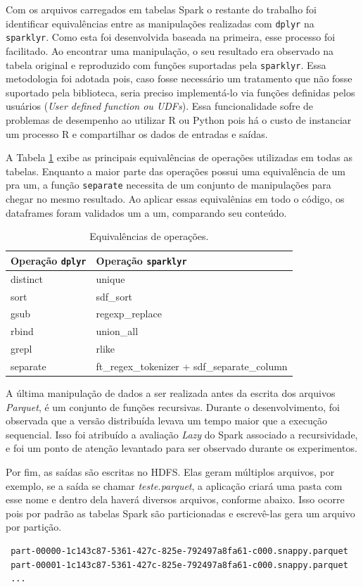 Com os arquivos carregados em tabelas Spark o restante do trabalho 
foi identificar equivalências entre as manipulações realizadas com \texttt{dplyr}
na \texttt{sparklyr}. Como esta foi desenvolvida baseada na primeira, esse 
processo foi facilitado. Ao encontrar uma manipulação, o seu resultado era 
observado na tabela original e reproduzido com funções suportadas pela 
\texttt{sparklyr}. Essa metodologia foi adotada pois, caso fosse necessário um 
tratamento que não fosse suportado pela biblioteca, seria preciso implementá-lo 
via funções definidas pelos usuários (\emph{User defined function ou UDFs}). 
Essa funcionalidade sofre de problemas de desempenho ao utilizar R ou Python 
pois há o custo de instanciar um processo R e compartilhar os dados de entradas 
e saídas. 

A Tabela \ref{tab:equivalence} exibe as principais equivalências de operações 
utilizadas em todas as tabelas. Enquanto a maior parte das operações possui uma 
equivalência de um pra um, a função \texttt{separate} necessita de um conjunto 
de manipulações para chegar no mesmo resultado. Ao aplicar essas equivalênias em 
todo o código, os dataframes foram validados um a um, comparando seu conteúdo. 

\begin{table}[H]
\centering
\begin{tabular}{l l} \toprule
\textbf{Operação \texttt{dplyr}}  &  \textbf{Operação \texttt{sparklyr}}\\ 
\midrule
distinct	& unique  \\
sort		& sdf\_sort \\
gsub		& regexp\_replace\\
rbind		& union\_all\\
grepl		& rlike\\
separate	& ft\_regex\_tokenizer + sdf\_separate\_column       \\
\end{tabular}
\caption{Equivalências de operações.}
\label{tab:equivalence}
\end{table}

A última manipulação de dados a ser realizada antes da escrita dos arquivos 
\textit{Parquet}, é um conjunto de funções recursivas. Durante o 
desenvolvimento, foi observada que a versão distribuída levava 
um tempo maior que a execução sequencial. Isso foi atribuído a avaliação \emph{Lazy} 
do Spark associado a recursividade, e foi um ponto de atenção 
levantado para ser observado durante os experimentos.

Por fim, as saídas são escritas no HDFS. Elas geram múltiplos arquivos, por 
exemplo, se a saída se chamar \emph{teste.parquet}, a aplicação criará uma pasta 
com esse nome e dentro dela haverá diversos arquivos, conforme abaixo. Isso 
ocorre pois por padrão as tabelas Spark são particionadas e escrevê-las gera um 
arquivo por partição.

\footnotesize
\begin{lstlisting}
 part-00000-1c143c87-5361-427c-825e-792497a8fa61-c000.snappy.parquet
 part-00001-1c143c87-5361-427c-825e-792497a8fa61-c000.snappy.parquet
 ...
\end{lstlisting}







